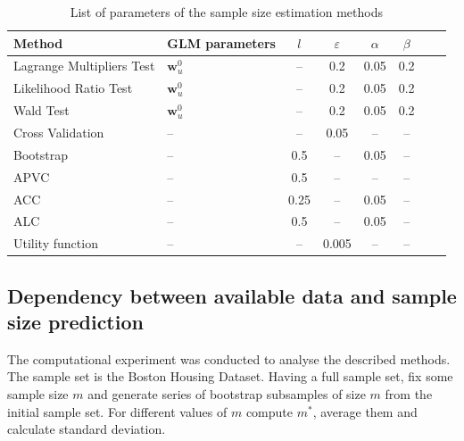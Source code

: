 \documentclass[
11pt,%
tightenlines,%
twoside,%
onecolumn,%
nofloats,%
nobibnotes,%
nofootinbib,%
superscriptaddress,%
noshowpacs,%
centertags]%
{revtex4}
\begin{document}
\begin{table}[h!]
\begin{center}
\caption{List of parameters of the sample size estimation methods}
\label{table3}
\begin{tabular}{|l|l|c|c|c|c|c|c|}
\hline 
Method& GLM parameters& $l$& $\varepsilon$& $\alpha$& $\beta$\\ \hline
\hline	
Lagrange	Multipliers Test	& $\textbf{w}_{u}^0$ & -- & 0.2& 0.05& 0.2\\
\hline	
Likelihood Ratio Test			& $\textbf{w}_{u}^0$ & -- & 0.2& 0.05& 0.2\\
\hline	
Wald	Test								& $\textbf{w}_{u}^0$ & -- & 0.2& 0.05& 0.2\\
\hline	
Cross Validation 					& -- & -- 	& 0.05& -- & --\\
\hline	
Bootstrap 								& -- & 0.5	& -- & 0.05& --\\
\hline	
APVC 									& -- & 0.5	& -- & -- & --\\
\hline	
ACC 									& -- & 0.25	& -- & 0.05& --\\
\hline	
ALC 										& -- & 0.5	& -- & 0.05& --\\
\hline	
Utility function 						& -- & -- 	& 0.005& -- & --\\
\hline
\end{tabular}
\end{center}
\end{table}


 
\subsection{Dependency between available data and sample size prediction}
The computational experiment was conducted to analyse the described methods. The sample set is the Boston Housing Dataset. Having a full sample set, fix some sample size $m$ and generate series of bootstrap subsamples of size $m$ from the initial sample set. For different values of $m$ compute $m^*$, average them and calculate standard deviation. 
    
\end{document}

